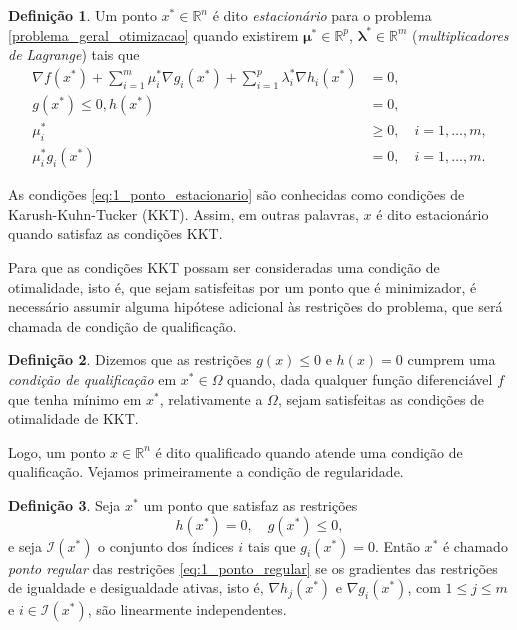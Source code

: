 \documentclass[12pt,a4paper]{scrartcl}
\def\RR{\mathds{R}}
\theoremstyle{definition}%
\newtheorem{defi}{Definição}
\begin{document}
\begin{defi} 
Um ponto $x^{*} \in \RR^{n} $ é dito \emph{estacionário} para o problema \eqref{problema_geral_otimizacao} quando existirem $\boldsymbol{\mu}^{*} \in \RR^{p} $, $\boldsymbol{\lambda}^{*} \in \RR^{m} $ (\emph{multiplicadores de Lagrange}) tais que
\begin{align} \label{eq:1_ponto_estacionario}
\nabla f(x^{*})+\sum_{i=1}^{m} \mu_{i}^{*} \nabla g_{i}(x^{*})+\sum_{i=1}^{p} \lambda_{i}^{*} \nabla h_{i}(x^{*}) & =0, \\ 
g(x^{*}) \leq 0, h(x^{*}) & =0,  \label{eq:2_ponto_estacionario} \\ 
\mu_{i}^{*} & \geq 0, \quad i= 1, \ldots , m,   \label{eq:3_ponto_estacionario} \\ 
\mu_{i}^{*} g_{i}(x^{*}) & =0, \quad i= 1, \ldots , m.  \label{eq:4_ponto_estacionario}
\end{align}


\end{defi}
As condições \eqref{eq:1_ponto_estacionario} são conhecidas como condições de Karush-Kuhn-Tucker (KKT). Assim, em outras palavras, $x$ é dito estacionário quando satisfaz as condições KKT. 


Para que as condições KKT possam ser consideradas uma condição de otimalidade, isto é, que sejam satisfeitas por um ponto que é minimizador, é necessário assumir alguma hipótese adicional às restrições do problema, que será chamada de condição de qualificação.

\begin{defi}
Dizemos que as restrições $g(x) \leq 0$ e $h(x)=0$ cumprem uma \emph{condição de qualificação} em $x^{*} \in \Omega$ quando, dada qualquer função diferenciável $f$ que tenha mínimo em $x^{*}$, relativamente a $\Omega$, sejam satisfeitas as condições de otimalidade de KKT.
\end{defi}
Logo, um ponto $x \in \RR^{n}$ é dito qualificado quando atende uma condição de qualificação. Vejamos primeiramente a condição de regularidade.

\begin{defi} \label{defi:ponto_regular}
Seja $x^{*}$ um ponto que satisfaz as restrições
\[
h(x^{*}) = 0, \quad g(x^{*}) \leq 0, \label{eq:1_ponto_regular}
\]
e seja $\mathcal{I}(x^{*})$ o conjunto dos índices $i$ tais que $g_{i}(x^{*}) = 0$. Então $x^{*}$ é chamado \emph{ponto regular} das restrições \eqref{eq:1_ponto_regular} se os gradientes das restrições de igualdade e desigualdade ativas, isto é, $\nabla h_{j}(x^{*})$ e $\nabla g_{i}(x^{*})$, com $1 \leq j \leq m$ e $i \in \mathcal{I}(x^{*})$, são linearmente independentes.
\end{defi}
\end{document}

